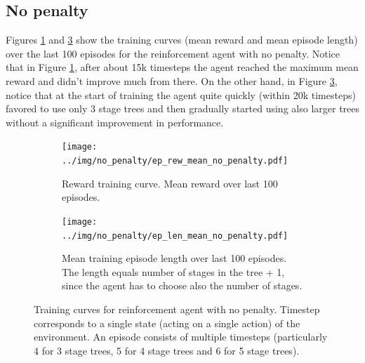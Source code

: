 \subsection{No penalty}
\label{subsection:nopenalty}
Figures \ref{fig:ep_rew_mean_no_penalty} and \ref{fig:ep_len_mean_no_penalty} show the training curves (mean reward and mean episode length) over the last 100 episodes for the reinforcement agent with no penalty. Notice that in Figure \ref{fig:ep_rew_mean_no_penalty}, after about 15k timesteps the agent reached the maximum mean reward and didn't improve much from there. On the other hand, in Figure \ref{fig:ep_len_mean_no_penalty}, notice that at the start of training the agent quite quickly (within 20k timesteps) favored to use only 3 stage trees and then gradually started using also larger trees without a significant improvement in performance.
\begin{figure}[H]
\centering
\begin{subfigure}[t]{.49\textwidth}
  \texttt{[image: ../img/no\_penalty/ep\_rew\_mean\_no\_penalty.pdf]}
  \caption{Reward training curve. Mean reward over last 100 episodes.}
  \label{fig:ep_rew_mean_no_penalty}
\end{subfigure}
\begin{subfigure}[t]{.49\textwidth}
  \texttt{[image: ../img/no\_penalty/ep\_len\_mean\_no\_penalty.pdf]}
  \caption{Mean training episode length over last 100 episodes. The length equals number of stages in the tree + 1, since the agent has to choose also the number of stages.}
  \label{fig:ep_len_mean_no_penalty}
\end{subfigure}
\caption{Training curves for reinforcement agent with no penalty. Timestep corresponds to a single state (acting on a single action) of the environment. An episode consists of multiple timesteps (particularly 4 for 3 stage trees, 5 for 4 stage trees and 6 for 5 stage trees).}
\end{figure}



